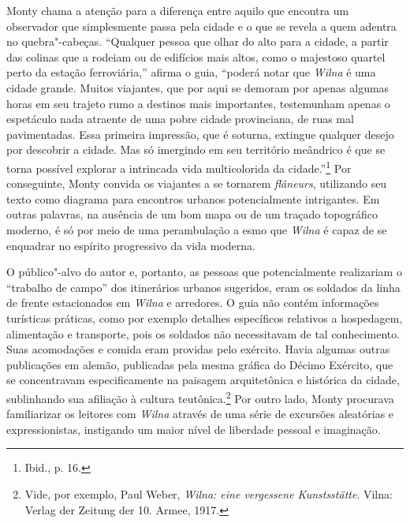 Monty chama a atenção para a diferença entre aquilo que encontra um
observador que simplesmente passa pela cidade e o que se revela a quem
adentra no quebra"-cabeças. ``Qualquer pessoa que olhar do alto para a
cidade, a partir das colinas que a rodeiam ou de edifícios mais altos,
como o majestoso quartel perto da estação ferroviária,'' afirma o guia,
``poderá notar que \textit{Wilna} é uma cidade grande. Muitos viajantes, que por
aqui se demoram por apenas algumas horas em seu trajeto rumo a destinos
mais importantes, testemunham apenas o espetáculo nada atraente de uma
pobre cidade provinciana, de ruas mal pavimentadas. Essa primeira
impressão, que é soturna, extingue qualquer desejo por descobrir a
cidade. Mas só imergindo em seu território meândrico é que se torna
possível explorar a intrincada vida multicolorida da cidade.''\footnote{Ibid., p. 16.} Por conseguinte, Monty convida os viajantes a se tornarem \textit{flâneurs}, utilizando seu texto como diagrama para encontros
urbanos potencialmente intrigantes. Em outras palavras, na ausência de
um bom mapa ou de um traçado topográfico moderno, é só por meio de uma
perambulação a esmo que \textit{Wilna} é capaz de se enquadrar no espírito
progressivo da vida moderna.

O público"-alvo do autor e, portanto, as pessoas que potencialmente
realizariam o ``trabalho de campo'' dos itinerários urbanos sugeridos,
eram os soldados da linha de frente estacionados em \textit{Wilna} e arredores. O
guia não contém informações turísticas práticas, como por exemplo
detalhes específicos relativos a hospedagem, alimentação e transporte,
pois os soldados não necessitavam de tal conhecimento. Suas acomodações
e comida eram providas pelo exército. Havia algumas outras publicações
em alemão, publicadas pela mesma gráfica do Décimo Exército, que se
concentravam especificamente na paisagem arquitetônica e histórica da
cidade, sublinhando sua afiliação à cultura teutônica.\footnote{Vide, por exemplo, Paul Weber, \textit{Wilna: eine vergessene Kunstsstätte}. Vilna: Verlag der Zeitung der 10. Armee, 1917.} Por outro lado, Monty procurava familiarizar os leitores com \textit{Wilna} através de uma série de
excursões aleatórias e expressionistas, instigando um maior nível de
liberdade pessoal e imaginação.

%

